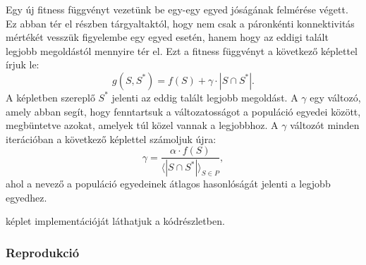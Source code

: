 Egy új fitness függvényt vezetünk be egy-egy egyed jóságának felmérése végett.
Ez abban tér el  részben tárgyaltaktól,
hogy nem csak a páronkénti konnektivitás mértékét vesszük figyelembe egy egyed esetén,
hanem hogy az eddigi talált legjobb megoldástól mennyire tér el.
Ezt a fitness függvényt a következő képlettel írjuk le:
\begin{equation}\label{eqn:SOCNDP_GA_FITNESS_FUNCTION}
  g(S, S^{*}) = f(S) + \gamma \cdot |S \cap S^{*}|.
\end{equation}
A képletben szereplő $S^{*}$ jelenti az eddig talált legjobb megoldást.
A $\gamma$ egy változó, amely abban segít, hogy fenntartsuk a változatosságot a populáció egyedei között,
megbüntetve azokat, amelyek túl közel vannak a legjobbhoz.
A $\gamma$ változót minden iterációban a következő képlettel számoljuk újra:
\begin{equation}\label{eqn:SOCNDP_GA_GAMMA}
  \gamma = \frac{\alpha \cdot f(S)}{\langle |S \cap S^{*}| \rangle_{S \in P}},
\end{equation}
ahol a nevező a populáció egyedeinek átlagos hasonlóságát jelenti a legjobb egyedhez.

 képlet implementációját láthatjuk a  kódrészletben.


\subsubsection{Reprodukció}
